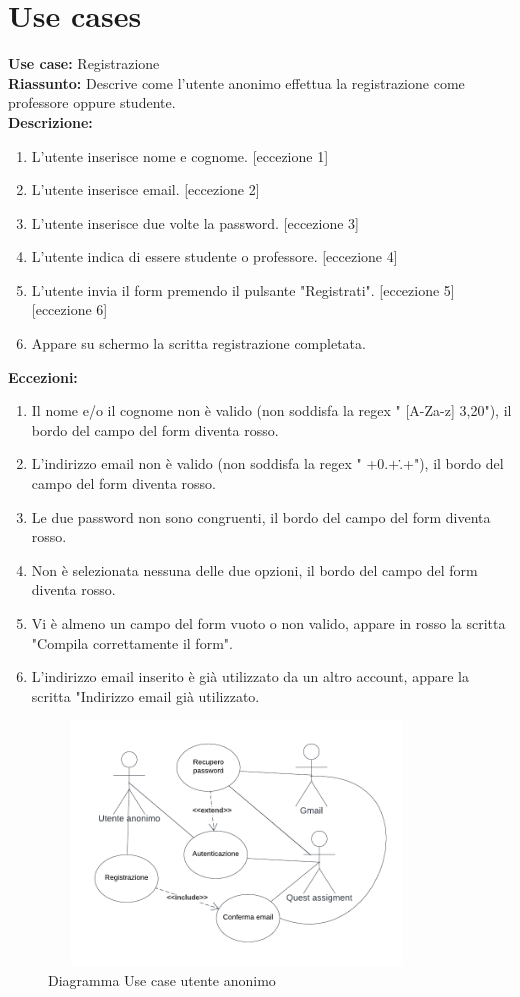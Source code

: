 \section{Use cases}
\textbf{Use case:} Registrazione\\
\textbf{Riassunto:} Descrive come l'utente anonimo effettua la registrazione come professore oppure studente.\\
\textbf{Descrizione:} \begin{enumerate}
  \item L'utente inserisce nome e cognome. [eccezione 1]
  \item L'utente inserisce email. [eccezione 2]
  \item L'utente inserisce due volte la password. [eccezione 3]
  \item L'utente indica di essere studente o professore. [eccezione 4]
  \item L'utente invia il form premendo il pulsante "Registrati". [eccezione 5] [eccezione 6]
  \item Appare su schermo la scritta registrazione completata.
\end{enumerate}
\textbf{Eccezioni: }\begin{enumerate}
  \item Il nome e/o il cognome non è valido (non soddisfa la regex " [A-Za-z] {3,20}"), il bordo del campo del form diventa rosso.

  \item L'indirizzo email non è valido (non soddisfa la regex " +0.+\..+"), il bordo del campo del form diventa rosso.

  \item Le due password non sono congruenti, il bordo del campo del form diventa rosso.

  \item Non è selezionata nessuna delle due opzioni, il bordo del campo del form diventa rosso.

  \item Vi è almeno un campo del form vuoto o non valido, appare in rosso la scritta "Compila correttamente il form".

  \item L'indirizzo email inserito è già utilizzato da un altro account, appare la scritta "Indirizzo email già utilizzato.
\end{enumerate}
\begin{figure}[h!]
  \centerline{\includegraphics[trim={0 0.9cm 0 0.9cm},clip, angle=0,height=6.5cm,width=10cm]{figures/anonimo.pdf}}
  \caption{Diagramma Use case utente anonimo}
\end{figure}

